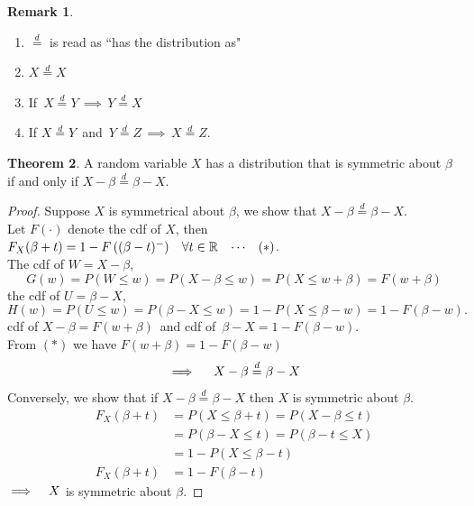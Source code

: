 \documentclass[12pt,a4paper]{report}
\theoremstyle{definition}
\newtheorem{thm}{Theorem}[section]
\newtheorem{remark}[thm]{Remark}
\theoremstyle{plain}
\begin{document}
 
 \newpage
\begin{remark}
\begin{enumerate}
\item[(i)] $\overset{d}{=}$ is read as ``has the distribution as"
\item[(ii)] $X \overset{d}{=} X$
\item[(iii)] If $\, X\overset{d}{=} Y\, \implies\, Y \overset{d}{=} X$
\item[(iv)] If $X \overset{d}{=} Y\,$ and $\, Y\overset{d}{=}Z\, \implies\, X\overset{d}{=} Z$.\\
\end{enumerate}
\end{remark}


\begin{thm}
A random variable $X$ has a distribution that is symmetric about $\beta$ if and only if $X- \beta \overset{d}{=}\beta - X$.
\end{thm}
 
 
 
\begin{proof}
Suppose $X$ is symmetrical about $\beta$, we show that $X - \beta \overset{d}{=} \beta - X$.\\
Let $F(\cdot)$ denote the cdf of $X$, then 
$F_X(\beta + t) = 1 - F\left((\beta - t)^-\right) \hspace{0.3cm} \forall t\in \mathbb{R}\hspace{0.3cm}\cdots\hspace{0.3cm} (*)$.\\
The cdf of $W = X  - \beta$, 
$$G(w) = P(W\leq w) = P(X-\beta \leq w) = P(X\leq w +\beta ) = F(w + \beta)$$
the cdf of $U = \beta - X$, 
$$H(w) = P(U\leq w) = P(\beta  - X \leq w) = 1  - P(X\leq \beta - w) = 1 - F(\beta - w).$$
cdf of $X - \beta = F(w + \beta)\,$ and cdf of $\, \beta - X = 1 - F(\beta - w)$.\\

From $(*)$ we have $F(w  + \beta) = 1 - F(\beta - w)$
$$\implies\hspace{0.4cm} X - \beta \overset{d}{=} \beta - X$$
Conversely, we show that if $X- \beta \overset{d}{=} \beta - X$ then $X$ is symmetric about $\beta$.
\begin{align*}
F_X(\beta + t) & = P(X\leq \beta + t) = P(X - \beta \leq t)\\
& = P(\beta - X \leq t ) = P(\beta - t \leq X)\\
& = 1 - P(X\leq \beta - t)\\
F_X(\beta + t) & = 1 - F(\beta - t)
\end{align*} 
$\implies\hspace{0.3cm} X$ is symmetric about $\beta$.
\end{proof}
\end{document}
